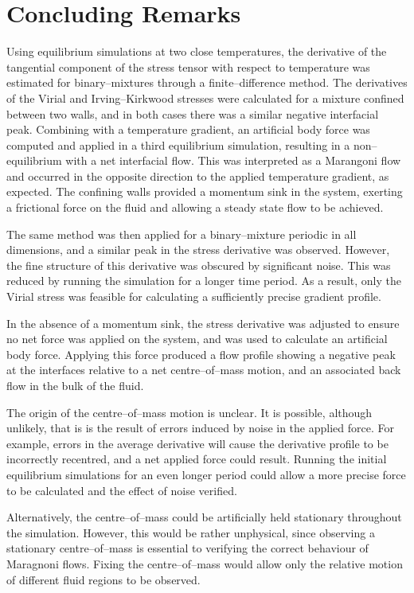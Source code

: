 \section{Concluding Remarks}
Using equilibrium simulations at two close temperatures, the derivative of the tangential component of the stress tensor with respect to temperature was estimated for binary--mixtures through a finite--difference method.
The derivatives of the Virial and Irving--Kirkwood stresses were calculated for a mixture confined between two walls, and in both cases there was a similar negative interfacial peak.
Combining with a temperature gradient, an artificial body force was computed and applied in a third equilibrium simulation, resulting in a non--equilibrium with a net interfacial flow.
This was interpreted as a Marangoni flow and occurred in the opposite direction to the applied temperature gradient, as expected.
The confining walls provided a momentum sink in the system, exerting a frictional force on the fluid and allowing a steady state flow to be achieved.

The same method was then applied for a binary--mixture periodic in all dimensions, and a similar peak in the stress derivative was observed.
However, the fine structure of this derivative was obscured by significant noise.
This was reduced by running the simulation for a longer time period.
As a result, only the Virial stress was feasible for calculating a sufficiently precise gradient profile.

In the absence of a momentum sink, the stress derivative was adjusted to ensure no net force was applied on the system, and was used to calculate an artificial body force.
Applying this force produced a flow profile showing a negative peak at the interfaces relative to a net centre--of--mass motion, and an associated back flow in the bulk of the fluid.

The origin of the centre--of--mass motion is unclear. 
It is possible, although unlikely, that is is the result of errors induced by noise in the applied force.
For example, errors in the average derivative will cause the derivative profile to be incorrectly recentred, and a net applied force could result.
Running the initial equilibrium simulations for an even longer period could allow a more precise force to be calculated and the effect of noise verified. 

Alternatively, the centre--of--mass could be artificially held stationary throughout the simulation.
However, this would be rather unphysical, since observing a stationary centre--of--mass is essential to verifying the correct behaviour of Maragnoni flows.
Fixing the centre--of--mass would allow only the relative motion of different fluid regions to be observed.

